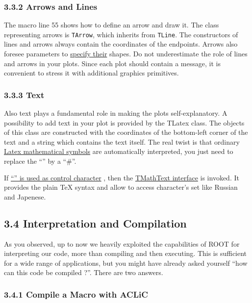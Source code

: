 \documentclass{article}
\begin{document}
\subsubsection{3.3.2 Arrows and Lines}\label{arrows-and-lines}

The macro line 55 shows how to define an arrow and draw it. The class
representing arrows is \texttt{TArrow}, which inherits from
\texttt{TLine}. The constructors of lines and arrows always contain the
coordinates of the endpoints. Arrows also foresee parameters to
\href{http://root.cern.ch/root/htmldoc/TArrow.html}{specify their}
shapes. Do not underestimate the role of lines and arrows in your plots.
Since each plot should contain a message, it is convenient to stress it
with additional graphics primitives.

\subsubsection{3.3.3 Text}\label{text}

Also text plays a fundamental role in making the plots self-explanatory.
A possibility to add text in your plot is provided by the TLatex class.
The objects of this class are constructed with the coordinates of the
bottom-left corner of the text and a string which contains the text
itself. The real twist is that ordinary
\href{http://root.cern.ch/root/htmldoc/TLatex.html\#L5}{Latex
mathematical symbols} are automatically interpreted, you just need to
replace the ``'' by a ``\#''.

If \href{http://root.cern.ch/root/htmldoc/TLatex.html\#L14}{``'' is used
as control character} , then the
\href{http://root.cern.ch/root/htmldoc/TMathText.html}{TMathText
interface} is invoked. It provides the plain TeX syntax and allow to
access character's set like Russian and Japenese.

\subsection{3.4 Interpretation and
Compilation}\label{interpretation-and-compilation}

As you observed, up to now we heavily exploited the capabilities of ROOT
for interpreting our code, more than compiling and then executing. This
is sufficient for a wide range of applications, but you might have
already asked yourself ``how can this code be compiled ?''. There are
two answers.

\subsubsection{3.4.1 Compile a Macro with
ACLiC}\label{compile-a-macro-with-aclic}
\end{document}
